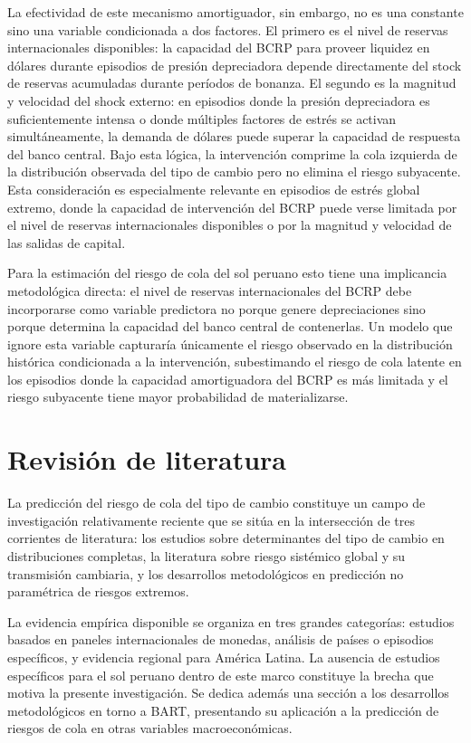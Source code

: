 ﻿\documentclass[11pt,a4paper]{article}
\begin{document}
La efectividad de este mecanismo amortiguador, sin embargo, no es una constante sino una variable condicionada a dos factores. El primero es el nivel de reservas internacionales disponibles: la capacidad del BCRP para proveer liquidez en dólares durante episodios de presión depreciadora depende directamente del stock de reservas acumuladas durante períodos de bonanza. El segundo es la magnitud y velocidad del shock externo: en episodios donde la presión depreciadora es suficientemente intensa o donde múltiples factores de estrés se activan simultáneamente, la demanda de dólares puede superar la capacidad de respuesta del banco central. Bajo esta lógica, la intervención comprime la cola izquierda de la distribución observada del tipo de cambio pero no elimina el riesgo subyacente. Esta consideración es especialmente relevante en episodios de estrés global extremo, donde la capacidad de intervención del BCRP puede verse limitada por el nivel de reservas internacionales disponibles o por la magnitud y velocidad de las salidas de capital.

Para la estimación del riesgo de cola del sol peruano esto tiene una implicancia metodológica directa: el nivel de reservas internacionales del BCRP debe incorporarse como variable predictora no porque genere depreciaciones sino porque determina la capacidad del banco central de contenerlas. Un modelo que ignore esta variable capturaría únicamente el riesgo observado en la distribución histórica condicionada a la intervención, subestimando el riesgo de cola latente en los episodios donde la capacidad amortiguadora del BCRP es más limitada y el riesgo subyacente tiene mayor probabilidad de materializarse. 


\section{Revisión de literatura}

La predicción del riesgo de cola del tipo de cambio constituye un campo de investigación relativamente reciente que se sitúa en la intersección de tres corrientes de literatura: los estudios sobre determinantes del tipo de cambio en distribuciones completas, la literatura sobre riesgo sistémico global y su transmisión cambiaria, y los desarrollos metodológicos en predicción no paramétrica de riesgos extremos.

La evidencia empírica disponible se organiza en tres grandes categorías: estudios basados en paneles internacionales de monedas, análisis de países o episodios específicos, y evidencia regional para América Latina. La ausencia de estudios específicos para el sol peruano dentro de este marco constituye la brecha que motiva la presente investigación. Se dedica además una sección a los desarrollos metodológicos en torno a BART, presentando su aplicación a la predicción de riesgos de cola en otras variables macroeconómicas.
\end{document}

